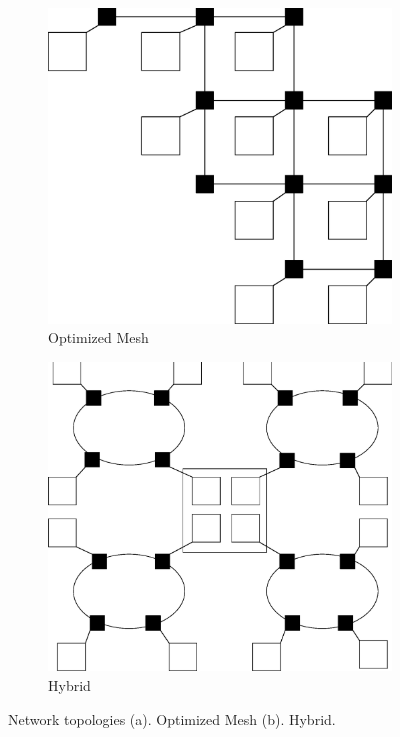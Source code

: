 \begin{figure}
\vspace{10mm}
\centering
\begin{subfigure}{.5\textwidth}
  \centering
  \includegraphics[width=.9\linewidth]{Optimized_mesh.eps}
  \caption{Optimized Mesh}
  \label{fig:2.6a}
\end{subfigure}%
\begin{subfigure}{.5\textwidth}
  \centering
  \includegraphics[width=.9\linewidth]{hybrid.eps}
  \caption{Hybrid}
  \label{fig:2.6b}
\end{subfigure}
\caption[Optimized Mesh and Hybrid]{Network topologies (a). Optimized Mesh (b). Hybrid.}
\label{fig:2.6}
\vspace{10mm}
\end{figure}



